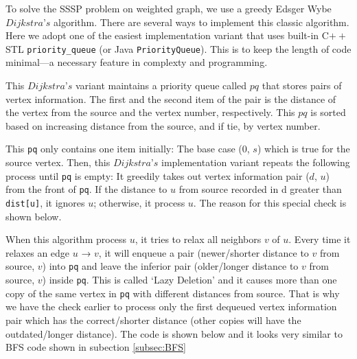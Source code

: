 \hspace{7mm}To solve the SSSP problem on weighted graph, we use a greedy Edsger Wybe $Dijkstra’s$ algorithm. There are several ways to implement this classic algorithm. Here we adopt one of the easiest implementation variant that uses built-in C$++$ STL \lstinline|priority_queue| (or Java \lstinline|PriorityQueue|). This is to keep the length of code minimal—a necessary feature in complexty and programming.

\hspace{7mm}This $Dijkstra’s$ variant maintains a priority queue called $pq$ that stores pairs of vertex
information. The first and the second item of the pair is the distance of the vertex from the
source and the vertex number, respectively. This $pq$ is sorted based on increasing distance
from the source, and if tie, by vertex number.

\hspace{7mm}This \lstinline|pq| only contains one item initially: The base case ($0$, $s$) which is true for the source
vertex. Then, this $Dijkstra’s$ implementation variant repeats the following process until \lstinline|pq|
is empty: It greedily takes out vertex information pair ($d$, $u$) from the front of \lstinline|pq|. If the
distance to $u$ from source recorded in d greater than \lstinline|dist[u]|, it ignores $u$; otherwise, it
process $u$. The reason for this special check is shown below.

\hspace{7mm}When this algorithm process $u$, it tries to relax \footnotemark 
{}
all neighbors $v$ of $u$. Every time it
relaxes an edge $u$ → $v$, it will enqueue a pair (newer/shorter distance to $v$ from source, $v$)
into \lstinline|pq| and leave the inferior pair (older/longer distance to $v$ from source, $v$) inside \lstinline|pq|. This
is called ‘Lazy Deletion’ and it causes more than one copy of the same vertex in \lstinline|pq| with
different distances from source. That is why we have the check earlier to process only the
first dequeued vertex information pair which has the correct/shorter distance (other copies
will have the outdated/longer distance). The code is shown below and it looks very similar
to BFS code shown in subection \ref{subsec:BFS}\newline\newline

